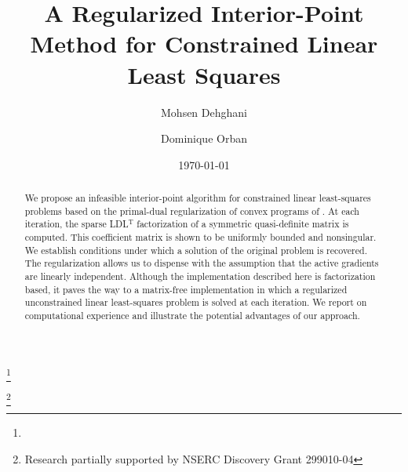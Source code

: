 \documentclass{amsart}
\begin{document}
\title[Regularized Constrained Least Squares]{%
  A Regularized Interior-Point Method for Constrained Linear Least Squares
}

\author[M. Dehghani]{Mohsen Dehghani}
\address{%
  GERAD, Montr\'eal, Canada
}
\thanks{}

\author[D. Orban]{Dominique Orban}
\address{%
  GERAD and
  Mathematics and Industrial Engineering Department \\
  \'Ecole Polytechnique, Montr\'eal, Canada
}
\thanks{Research partially supported by NSERC Discovery Grant 299010-04}



\date{\today}

\begin{abstract}
  We propose an infeasible interior-point algorithm for constrained linear
  least-squares problems based on the primal-dual regularization of convex
  programs of \cite{friedlander-orban-2012}. At each iteration, the sparse
  LDL${}^{\mathrm{T}}$ factorization of a symmetric quasi-definite matrix is
  computed. This coefficient matrix is shown to be uniformly bounded and
  nonsingular. We establish conditions under which a solution of the original
  problem is recovered. The regularization allows us to dispense with the
  assumption that the active gradients are linearly independent. Although the
  implementation described here is factorization based, it paves the way to a
  matrix-free implementation in which a regularized unconstrained linear
  least-squares problem is solved at each iteration. We report on computational
  experience and illustrate the potential advantages of our approach.
\end{abstract}

\pagestyle{myheadings}

\maketitle

\end{document}
